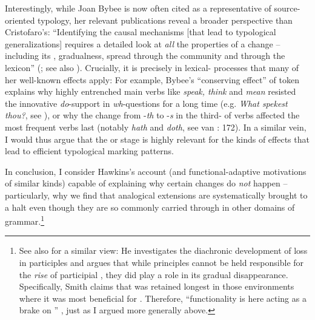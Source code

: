\documentclass[output=paper]{langsci/langscibook}
\begin{document}
Interestingly, while Joan Bybee is now often cited as a representative of source-oriented typology, her relevant publications reveal a broader perspective than Cristofaro’s: “Identifying the causal mechanisms [that lead to typological generalizations] requires a detailed look at \textit{all} the properties of a change – including its , gradualness, spread through the community and through the lexicon” (\citealt[108]{Bybee2008_StructPres}; see also \citealt{Bybee1988_Diachr}). Crucially, it is precisely in lexical- processes that many of her well-known  effects apply: For example, Bybee’s “conserving effect” of token  explains why highly entrenched main verbs like \textit{speak, think} and \textit{mean} resisted the innovative \textit{do}{}-support in \textit{wh}{}-questions for a long time (e.g. \textit{What spekest thou?}, see \citealt{Ogura1993_do}), or why the change from -\textit{th} to -\textit{s} in the third- of  verbs affected the most frequent verbs last (notably \textit{hath} and \textit{doth}, see van \citealt{Gelderen2014_Hist}: 172). In a similar vein, I would thus argue that the  or  stage is highly relevant for the kinds of effects that lead to efficient typological marking patterns. 

In conclusion, I consider Hawkins’s account (and functional-adaptive motivations of similar kinds) capable of explaining why certain changes do \textit{not} happen – particularly, why we find that analogical extensions are systematically brought to a halt even though they are so commonly carried through in other domains of grammar.\footnote{See also \citet{Smith2001_Act} for a similar view: He investigates the diachronic development of  loss in  participles and argues that while  principles cannot be held responsible for the \textit{rise} of participial , they did play a role in its gradual disappearance. Specifically, Smith claims that  was retained longest in those environments where it was most beneficial for . Therefore, “functionality is here acting as a brake on ” \citep[214]{Smith2001_Act}, just as I argued more generally above.}
\end{document}
